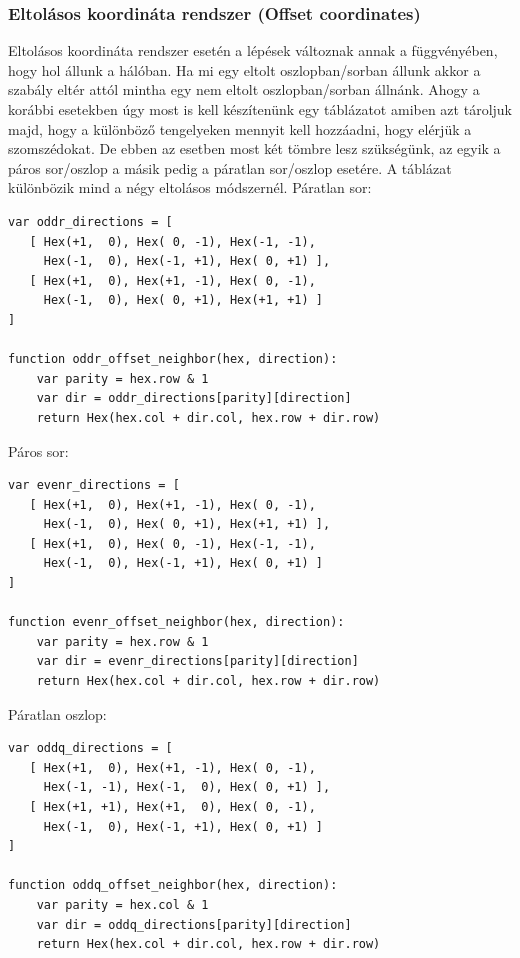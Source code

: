 \subsubsection{Eltolásos koordináta rendszer (Offset coordinates)}

\noindent Eltolásos koordináta rendszer esetén a lépések változnak annak a függvényében, hogy hol állunk a hálóban. Ha mi egy eltolt oszlopban/sorban állunk akkor a szabály eltér attól mintha egy nem eltolt oszlopban/sorban állnánk.
\newline
\newline Ahogy a korábbi esetekben úgy most is kell készítenünk egy táblázatot amiben azt tároljuk majd, hogy a különböző tengelyeken mennyit kell hozzáadni, hogy elérjük a szomszédokat. De ebben az esetben most két tömbre lesz szükségünk, az egyik a páros sor/oszlop a másik pedig a páratlan sor/oszlop esetére.
\newline
\newline A táblázat különbözik mind a négy eltolásos módszernél.
\newline
\newline Páratlan sor: 
\begin{verbatim}
var oddr_directions = [
   [ Hex(+1,  0), Hex( 0, -1), Hex(-1, -1),
     Hex(-1,  0), Hex(-1, +1), Hex( 0, +1) ],
   [ Hex(+1,  0), Hex(+1, -1), Hex( 0, -1),
     Hex(-1,  0), Hex( 0, +1), Hex(+1, +1) ]
]

function oddr_offset_neighbor(hex, direction):
    var parity = hex.row & 1
    var dir = oddr_directions[parity][direction]
    return Hex(hex.col + dir.col, hex.row + dir.row)
\end{verbatim}
Páros sor: 
\begin{verbatim}
var evenr_directions = [
   [ Hex(+1,  0), Hex(+1, -1), Hex( 0, -1),
     Hex(-1,  0), Hex( 0, +1), Hex(+1, +1) ],
   [ Hex(+1,  0), Hex( 0, -1), Hex(-1, -1),
     Hex(-1,  0), Hex(-1, +1), Hex( 0, +1) ]
]

function evenr_offset_neighbor(hex, direction):
    var parity = hex.row & 1
    var dir = evenr_directions[parity][direction]
    return Hex(hex.col + dir.col, hex.row + dir.row)
\end{verbatim}
Páratlan oszlop: 
\begin{verbatim}
var oddq_directions = [
   [ Hex(+1,  0), Hex(+1, -1), Hex( 0, -1),
     Hex(-1, -1), Hex(-1,  0), Hex( 0, +1) ],
   [ Hex(+1, +1), Hex(+1,  0), Hex( 0, -1),
     Hex(-1,  0), Hex(-1, +1), Hex( 0, +1) ]
]

function oddq_offset_neighbor(hex, direction):
    var parity = hex.col & 1
    var dir = oddq_directions[parity][direction]
    return Hex(hex.col + dir.col, hex.row + dir.row)
\end{verbatim}
